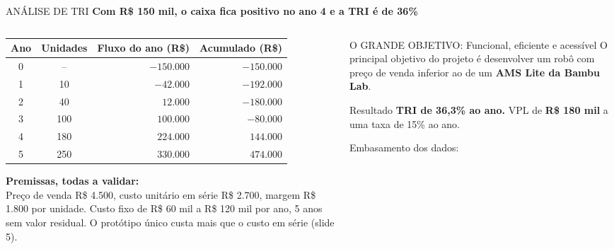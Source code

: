 \documentclass[aspectratio=169, 10pt]{beamer}
\newcommand{\currentpresenter}{Rodrigo}
\newcommand{\setpresenter}[1]{\renewcommand{\currentpresenter}{#1}}
\begin{document}
	\setpresenter{Júlio}
	\begin{frame}{ANÁLISE DE TRI}
		\textbf{\normalsize Com R\$ 150 mil, o caixa fica positivo no ano 4 e a TRI é de 36\%}
		\vspace{0.12cm}
		
		\begin{columns}[T]
			\begin{column}{0.53\textwidth}
				\scriptsize
				\begin{tabular}{c c r r}
					\toprule
					\textbf{Ano} & \textbf{Unidades} & \textbf{Fluxo do ano (R\$)} & \textbf{Acumulado (R\$)} \\
					\midrule
					0 & -- & $-150.000$ & $-150.000$ \\
					1 & 10 & $-42.000$ & $-192.000$ \\
					2 & 40 & $12.000$ & $-180.000$ \\
					3 & 100 & $100.000$ & $-80.000$ \\
					4 & 180 & $224.000$ & $144.000$ \\
					5 & 250 & $330.000$ & $474.000$ \\
					\bottomrule
				\end{tabular}
				
				\vspace{0.18cm}
				\textbf{Premissas, todas a validar:}\\
				Preço de venda R\$ 4.500, custo unitário em série R\$ 2.700, margem R\$ 1.800 por unidade. Custo fixo de R\$ 60 mil a R\$ 120 mil por ano, 5 anos sem valor residual. O protótipo único custa mais que o custo em série (slide 5).
			\end{column}
			
			\begin{column}{0.44\textwidth}
				\begin{block}{O GRANDE OBJETIVO: Funcional, eficiente e acessível}
					\scriptsize O principal objetivo do projeto é desenvolver um robô com preço de venda inferior ao de um \textbf{AMS Lite da Bambu Lab}.
				\end{block}
				
				\begin{alertblock}{Resultado}
					\footnotesize \textbf{TRI de 36,3\% ao ano.} VPL de \textbf{R\$ 180 mil} a uma taxa de 15\% ao ano.
				\end{alertblock}
				
				\vspace{0.08cm}
				\begin{flushright}
					\scriptsize Embasamento dos dados: 
				\end{flushright}
			\end{column}
		\end{columns}
	\end{frame}
	
\end{document}
